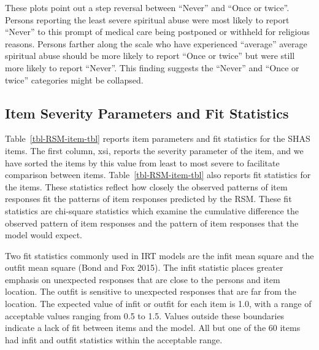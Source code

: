 \documentclass[
  letterpaper,
  DIV=11,
  numbers=noendperiod]{scrreport}
\begin{document}
These plots point out a step reversal between ``Never'' and ``Once or
twice''. Persons reporting the least severe spiritual abuse were most
likely to report ``Never'' to this prompt of medical care being
postponed or withheld for religious reasons. Persons farther along the
scale who have experienced ``average'' average spiritual abuse should be
more likely to report ``Once or twice'' but were still more likely to
report ``Never''. This finding suggests the ``Never'' and ``Once or
twice'' categories might be collapsed.

\hypertarget{item-severity-parameters-and-fit-statistics}{%
\subsection*{Item Severity Parameters and Fit
Statistics}\label{item-severity-parameters-and-fit-statistics}}

Table~\ref{tbl-RSM-item-tbl} reports item parameters and fit statistics
for the SHAS items. The first column, xsi, reports the severity
parameter of the item, and we have sorted the items by this value from
least to most severe to facilitate comparison between items.
Table~\ref{tbl-RSM-item-tbl} also reports fit statistics for the items.
These statistics reflect how closely the observed patterns of item
responses fit the patterns of item responses predicted by the RSM. These
fit statistics are chi-square statistics which examine the cumulative
difference the observed pattern of item responses and the pattern of
item responses that the model would expect.

Two fit statistics commonly used in IRT models are the infit mean square
and the outfit mean square (Bond and Fox 2015). The infit statistic
places greater emphasis on unexpected responses that are close to the
persons and item location. The outfit is sensitive to unexpected
responses that are far from the location. The expected value of infit or
outfit for each item is 1.0, with a range of acceptable values ranging
from 0.5 to 1.5. Values outside these boundaries indicate a lack of fit
between items and the model. All but one of the 60 items had infit and
outfit statistics within the acceptable range.
\end{document}
